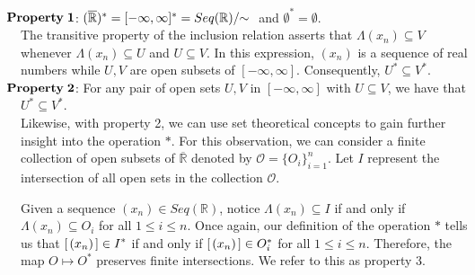 \documentclass{amsart}
\theoremstyle{definition}
\theoremstyle{plain}
\begin{document}
$\hspace{-4mm} \mathbf{Property \hspace{1mm} 1}$: $ (\overline{\mathbb{R}})^*= [-\infty,\infty]^* = Seq(\mathbb{R})/ \hspace{-1mm} \sim \hspace{1mm}$ and $\emptyset^* = \emptyset.$\\



The transitive property of the inclusion relation asserts that $\Lambda(x_n) \subseteq V$ whenever $\Lambda(x_n) \subseteq U$ and $U \subseteq V$. In this expression, $(x_n)$ is a sequence of real numbers
while $U,V$ are open subsets of  $[-\infty,\infty]$. Consequently, $U^* \subseteq V^*.$\\


$\hspace{-4mm} \mathbf{Property \hspace{1mm} 2}$: For any pair of open sets $U,V$ in $[-\infty,\infty]$ with $U \subseteq V$, we have that  $U^* \subseteq V^*.$\\

Likewise, with property 2, we can use set theoretical concepts to gain further insight into the operation $*$. For this observation, we can consider a finite collection of 
open subsets of $\overline{\mathbb{R}}$ denoted by $\mathcal{O} = \{O_i\}_{i=1}^{n}$.
Let $I$ represent the intersection of all open sets in the collection $\mathcal{O}$.

Given a sequence $(x_n) \in Seq(\mathbb{R})$, notice $\Lambda(x_n) \subseteq I$ if and only if $\Lambda(x_n) \subseteq O_i$ for all 
$1 \leq i \leq n$. Once again, our definition of the operation $*$ tells us that $\displaystyle [\hspace{0.5mm} (x_n) \hspace{0.5mm} ] \in I^*$ if 
and only if $[\hspace{0.5mm} (x_n) \hspace{0.5mm} ]  \in O_i^*$ for all $1 \leq i \leq n$. Therefore, the map $O \mapsto O^*$ preserves
finite intersections. We refer to this as property 3. \\
\end{document}
